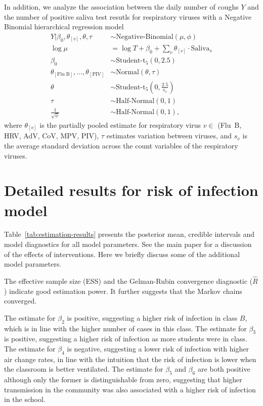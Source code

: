 \documentclass[fleqn,11pt]{wlscirep_supp}
\begin{document}
In addition, we analyze the association between the daily number of coughs $Y$ and the number of positive saliva test resutls for respiratory viruses with a Negative Binomial hierarchical regression model
\begin{align*}
    Y | \beta_0, \theta_{[v]}, \theta, \tau &\sim \text{Negative-Binomial}(\mu,\phi) \\
    \log \mu &= \log T + \beta_0 + \sum_v \theta_{[v]} \cdot \text{Saliva}_v \\
    \beta_0 &\sim \text{Student-t}_5(0, 2.5) \\
    \theta_{[\text{Flu~B}]}, \dots, \theta_{[\text{PIV}]} &\sim \text{Normal}\left(\theta, \tau\right) \\
    \theta &\sim \text{Student-t}_5\left(0, \frac{2.5}{s_{v}}\right) \\
    \tau &\sim \text{Half-Normal}\left(0, 1\right) \\
    \frac{1}{\sqrt{\phi}} &\sim \text{Half-Normal}(0,1),
\end{align*}
where $\theta_{[v]}$ is the partially pooled estimate for respiratory virus $v \in$ (Flu~B, HRV, AdV, CoV, MPV, PIV), $\tau$ estimates variation between viruses, and $s_v$ is the average standard deviation across the count variables of the respiratory viruses. 

\clearpage

\section{Detailed results for risk of infection model}\label{sec:detailed-redcap}

Table~\ref{tab:estimation-results} presents the posterior mean, credible intervals and model diagnostics for all model parameters. See the main paper for a discussion of the effects of interventions. Here we briefly discuss some of the additional model parameters.

The effective sample size (ESS) and the Gelman-Rubin convergence diagnostic ($\hat{R}$) indicate good estimation power. It further suggests that the Markov chains converged. 

The estimate for $\beta_2$ is positive, suggesting a higher risk of infection in class $B$, which is in line with the higher number of cases in this class. The estimate for $\beta_3$ is positive, suggesting a higher risk of infection as more students were in class. The estimate for $\beta_4$ is negative, suggesting a lower risk of infection with higher air change rates, in line with the intuition that the risk of infection is lower when the classroom is better ventilated. The estimate for $\beta_5$ and $\beta_6$ are both positive although only the former is distinguishable from zero, suggesting that higher transmission in the community was also associated with a higher risk of infection in the school. 
\end{document}
